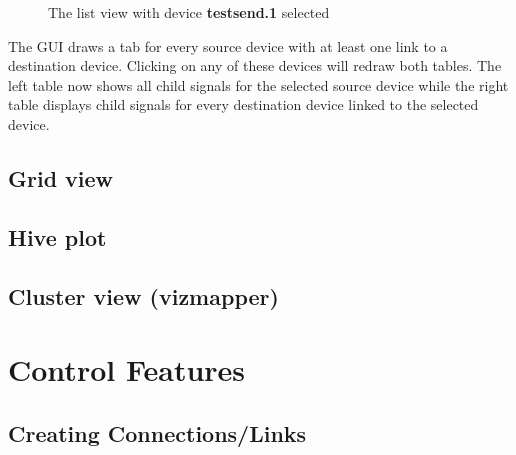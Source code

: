 \begin{figure}[ht]
\centering
\caption{The list view with device \textbf{testsend.1} selected}
\label{fig:list_view_single_link}
\end{figure}

The GUI draws a tab for every source device with at least one link to a destination device. Clicking on any of these devices will redraw both tables. The left table now shows all child signals for the selected source device while the right table displays child signals for every destination device linked to the selected device. 

\subsection{Grid view}
\subsection{Hive plot}
\subsection{Cluster view (vizmapper)}

\section{Control Features}
\subsection{Creating Connections/Links}

